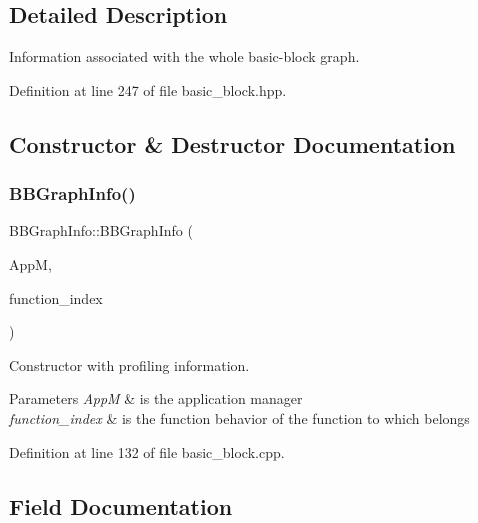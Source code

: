 \subsection{Detailed Description}
Information associated with the whole basic-\/block graph. 

Definition at line 247 of file basic\+\_\+block.\+hpp.



\subsection{Constructor \& Destructor Documentation}
\mbox{\label{structBBGraphInfo_a71fb8bf6a9de3af8df20fb93b5fe62d2}} 
\subsubsection{\texorpdfstring{B\+B\+Graph\+Info()}{BBGraphInfo()}}
{\footnotesize\ttfamily B\+B\+Graph\+Info\+::\+B\+B\+Graph\+Info (\begin{DoxyParamCaption}\item[{const \hyperlink{application__manager_8hpp_abb985163a2a3fb747f6f03b1eaadbb44}{application\+\_\+manager\+Const\+Ref}}]{AppM,  }\item[{const unsigned int}]{function\+\_\+index }\end{DoxyParamCaption})}



Constructor with profiling information. 


\begin{DoxyParams}{Parameters}
{\em AppM} & is the application manager \\
\hline
{\em function\+\_\+index} & is the function behavior of the function to which belongs \\
\hline
\end{DoxyParams}


Definition at line 132 of file basic\+\_\+block.\+cpp.



\subsection{Field Documentation}
\mbox{\label{structBBGraphInfo_aa4cba6c688559e4173cfd8e00133684c}} 
